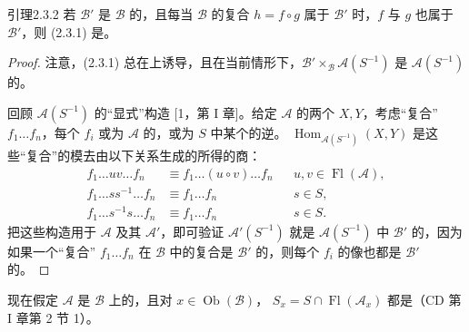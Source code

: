 \begin{SGAresult}{引理}{2.3.2}
若 $\mathcal B'$ 是 $\mathcal B$ 的，且每当 $\mathcal B$ 的复合 $h=f\circ g$ 属于 $\mathcal B'$ 时，$f$ 与 $g$ 也属于 $\mathcal B'$，则 (2.3.1) 是。
\end{SGAresult}
\begin{proof}
注意，(2.3.1) 总在上诱导，且在当前情形下，$\mathcal B'\times_{\mathcal B}\mathcal A(S^{-1})$ 是 $\mathcal A(S^{-1})$ 的。

回顾 $\mathcal A(S^{-1})$ 的“显式”构造 [1，第 I 章]。给定 $\mathcal A$ 的两个 $X,Y$，考虑“复合” $f_1\dots f_n$，每个 $f_i$ 或为 $\mathcal A$ 的，或为 $S$ 中某个的逆。 $\operatorname{Hom}_{\mathcal A(S^{-1})}(X,Y)$ 是这些“复合”的模去由以下关系生成的所得的商：
\[
\begin{aligned}
f_1\dots uv\dots f_n&\equiv f_1\dots(u\circ v)\dots f_n&&u,v\in\operatorname{Fl}(\mathcal A),\\
f_1\dots ss^{-1}\dots f_n&\equiv f_1\dots f_n&&s\in S,\\
f_1\dots s^{-1}s\dots f_n&\equiv f_1\dots f_n&&s\in S.
\end{aligned}
\]
把这些构造用于 $\mathcal A$ 及其 $\mathcal A'$，即可验证 $\mathcal A'(S^{-1})$ 就是 $\mathcal A(S^{-1})$ 中 $\mathcal B'$ 的，因为如果一个“复合” $f_1\dots f_n$ 在 $\mathcal B$ 中的复合是 $\mathcal B'$ 的，则每个 $f_i$ 的像也都是 $\mathcal B'$ 的。
\end{proof}
现在假定 $\mathcal A$ 是 $\mathcal B$ 上的，且对 $x\in\operatorname{Ob}(\mathcal B)$， $S_x=S\cap\operatorname{Fl}(\mathcal A_x)$ 都是（CD 第 I 章第 2 节 1）。

